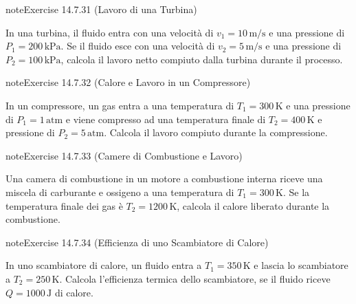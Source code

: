 \documentclass[letterpaper,10pt,italian]{jupyterBook}
\begin{document}
\begin{sphinxadmonition}{note}{Exercise 14.7.31 (Lavoro di una Turbina)}



\sphinxAtStartPar
In una turbina, il fluido entra con una velocità di \(v_1 = 10 \, \text{m/s}\) e una pressione di \(P_1 = 200 \, \text{kPa}\). Se il fluido esce con una velocità di \(v_2 = 5 \, \text{m/s}\) e una pressione di \(P_2 = 100 \, \text{kPa}\), calcola il lavoro netto compiuto dalla turbina durante il processo.
\end{sphinxadmonition}
 \label{exercise:ch/thermodynamics/principles-problems-exercise-31}

\begin{sphinxadmonition}{note}{Exercise 14.7.32 (Calore e Lavoro in un Compressore)}



\sphinxAtStartPar
In un compressore, un gas entra a una temperatura di \(T_1 = 300 \, \text{K}\) e una pressione di \(P_1 = 1 \, \text{atm}\) e viene compresso ad una temperatura finale di \(T_2 = 400 \, \text{K}\) e pressione di \(P_2 = 5 \, \text{atm}\). Calcola il lavoro compiuto durante la compressione.
\end{sphinxadmonition}
 \label{exercise:ch/thermodynamics/principles-problems-exercise-32}

\begin{sphinxadmonition}{note}{Exercise 14.7.33 (Camere di Combustione e Lavoro)}



\sphinxAtStartPar
Una camera di combustione in un motore a combustione interna riceve una miscela di carburante e ossigeno a una temperatura di \(T_1 = 300 \, \text{K}\). Se la temperatura finale dei gas è \(T_2 = 1200 \, \text{K}\), calcola il calore liberato durante la combustione.
\end{sphinxadmonition}
 \label{exercise:ch/thermodynamics/principles-problems-exercise-33}

\begin{sphinxadmonition}{note}{Exercise 14.7.34 (Efficienza di uno Scambiatore di Calore)}



\sphinxAtStartPar
In uno scambiatore di calore, un fluido entra a \(T_1 = 350 \, \text{K}\) e lascia lo scambiatore a \(T_2 = 250 \, \text{K}\). Calcola l’efficienza termica dello scambiatore, se il fluido riceve \(Q = 1000 \, \text{J}\) di calore.
\end{sphinxadmonition}
 \label{exercise:ch/thermodynamics/principles-problems-exercise-34}
\end{document}
